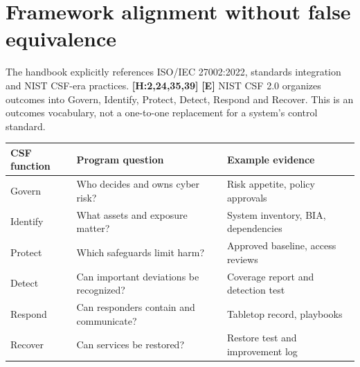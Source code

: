 \documentclass[10pt,letterpaper,oneside]{article}
\newcommand{\handbookref}[1]{\textsf{\color{accent}\textbf{[H:#1]}}}
\newcommand{\modernext}{\textsf{\color{muted}\textbf{[E]}}}
\begin{document}
\section{Framework alignment without false equivalence}
The handbook explicitly references ISO/IEC 27002:2022, standards integration and NIST CSF-era practices. \handbookref{2,24,35,39} \modernext{} NIST CSF 2.0 organizes outcomes into Govern, Identify, Protect, Detect, Respond and Recover. This is an outcomes vocabulary, not a one-to-one replacement for a system's control standard.
\par\medskip\noindent\begin{tabularx}{\textwidth}{@{}p{}X X@{}}\toprule
CSF function & Program question & Example evidence \\ \midrule
Govern & Who decides and owns cyber risk? & Risk appetite, policy approvals\\
Identify & What assets and exposure matter? & System inventory, BIA, dependencies\\
Protect & Which safeguards limit harm? & Approved baseline, access reviews\\
Detect & Can important deviations be recognized? & Coverage report and detection test\\
Respond & Can responders contain and communicate? & Tabletop record, playbooks\\
Recover & Can services be restored? & Restore test and improvement log\\
\bottomrule\end{tabularx}\par\medskip
\end{document}
